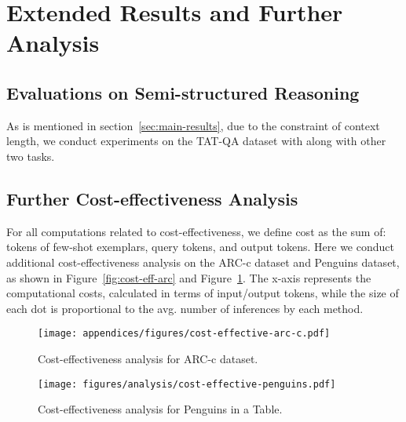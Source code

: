 \section{Extended Results and Further Analysis}

\subsection{Evaluations on Semi-structured Reasoning}
\label{appendix:tables}

As is mentioned in section~\ref{sec:main-results},
due to the constraint of context length,
we conduct experiments on the TAT-QA dataset with \turbol along with other two tasks.



\subsection{Further Cost-effectiveness Analysis}
\label{appendix:cost-effectiveness}

For all computations related to cost-effectiveness, 
we define cost as the sum of: tokens of few-shot exemplars, query tokens, and output tokens.
Here we conduct additional cost-effectiveness analysis on the ARC-c dataset and Penguins dataset, as shown in Figure~\ref{fig:cost-eff-arc} and Figure~\ref{fig:cost-eff-task}. 
The x-axis represents the computational costs, 
calculated in terms of input/output tokens, 
while the size of each dot is proportional to the avg. number of inferences by each method.

\begin{figure}[ht]
    \centering
    \begin{minipage}[t]{0.48\textwidth}
        \texttt{[image: appendices/figures/cost-effective-arc-c.pdf]}
        \caption{Cost-effectiveness analysis for ARC-c dataset.}
        \label{fig:cost-eff-arc}
    \end{minipage}
    \hfill
    \begin{minipage}[t]{0.48\textwidth}
        \texttt{[image: figures/analysis/cost-effective-penguins.pdf]}
        \caption{Cost-effectiveness analysis for Penguins in a Table.}
        \label{fig:cost-eff-task}
    \end{minipage}
\end{figure}

